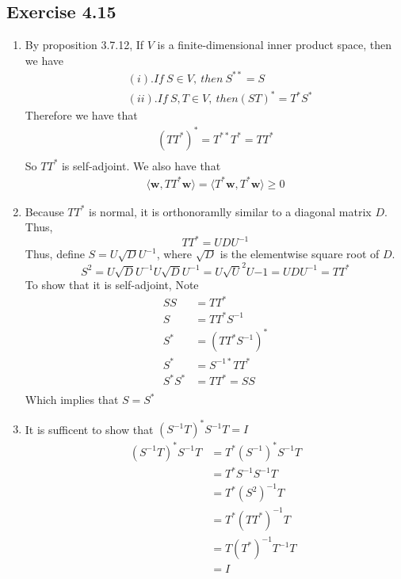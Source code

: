 \documentclass[letterpaper,12pt]{article}
\theoremstyle{definition}
\begin{document}
\subsection*{Exercise 4.15}
\begin{enumerate}
\item
By proposition 3.7.12, If $V$ is a finite-dimensional inner product space, then we have
\begin{align*}
&(i). If ~S \in V,~ then~ S^{**} = S\\
&(ii). If ~S,T \in V, ~then (ST)^* = T^*S^*
\end{align*}
Therefore we have that 
\begin{align*}
(TT^*)^* = T^{**}T^* = TT^* \\
\end{align*}
So $TT^*$ is self-adjoint. We also have that
\begin{align*}
\langle \mathbf{w}, TT^* \mathbf{w} \rangle = \langle T^* \mathbf{w}, T^* \mathbf{w} \rangle \geq 0
\end{align*}
\item Because $TT^*$ is normal, it is orthonoramlly similar to a diagonal matrix $D$. Thus, 
\[ TT^* = UDU^{-1} \]
Thus, define $S = U\sqrt{D}U^{-1}$, where $\sqrt{D}$ is the elementwise square root of $D$.\\
\[ S^2 = U\sqrt{D}U^{-1}U\sqrt{D}U^{-1} = U\sqrt{U}^2U{-1} = UDU^{-1} = TT^*\]
To show that it is self-adjoint, Note 
\begin{align*}
 SS &= TT^*\\
 S &= TT^*S^{-1}\\
 S^* &= (TT^*S^{-1})^*\\
 S^* &= S^{-1*}TT^*\\
 S^*S^* &= TT^* = SS\\
 \end{align*}
 Which implies that $S=S^*$
\item It is sufficent to show that $(S^{-1}T)^*S^{-1}T = I$
\begin{align*} 
(S^{-1}T)^*S^{-1}T &= T^*(S^{-1})^*S^{-1}T\\
&= T^*S^{-1}S^{-1}T\\
&= T^*(S^2)^{-1}T\\
&= T^*(TT^*)^{-1}T\\
&= T(T^*)^{-1}T^{-1}T\\
&= I\\
\end{align*}
\end {enumerate}
\end{document}
